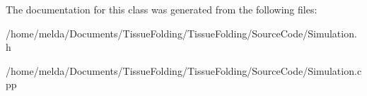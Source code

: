 The documentation for this class was generated from the following files\+:\begin{DoxyCompactItemize}
\item 
/home/melda/\+Documents/\+Tissue\+Folding/\+Tissue\+Folding/\+Source\+Code/Simulation.\+h\item 
/home/melda/\+Documents/\+Tissue\+Folding/\+Tissue\+Folding/\+Source\+Code/Simulation.\+cpp\end{DoxyCompactItemize}
